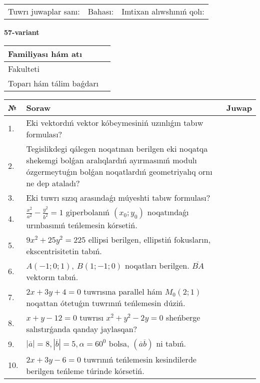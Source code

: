 \documentclass{article}
\begin{document}
\vspace{1cm}

\begin{tabular}{lll}
Tuwrı juwaplar sanı: \underline{\hspace{1.5cm}} & 
Bahası: \underline{\hspace{1.5cm}} & 
Imtixan alıwshınıń qolı: \underline{\hspace{2cm}} \\
\end{tabular}

\egroup

\newpage


\textbf{57-variant}\\

\bgroup
\def\arraystretch{1.6} %

\begin{tabular}{|m{5.7cm}|m{9.5cm}|}
\hline
Familiyası hám atı & \\
\hline
Fakulteti  & \\
\hline
Toparı hám tálim baǵdarı  & \\
\hline
\end{tabular}

\vspace{1cm}

\begin{tabular}{|m{0.7cm}|m{10cm}|m{4cm}|}
\hline
№ & Soraw & Juwap \\
\hline
1. & Eki vektordıń vektor kóbeymesiniń uzınlıǵın tabıw formulası? &  \\
\hline
2. & Tegislikdegi qálegen noqatınan berilgen eki noqatqa shekemgi bolǵan aralıqlardıń ayırmasınıń modulı ózgermeytuǵın bolǵan noqatlardıń geometriyalıq ornı ne dep ataladı? &  \\
\hline
3. & Eki tuwrı sızıq arasındaǵı múyeshti tabıw formulası? &  \\
\hline
4. & $\frac{x^2}{a^2}-\frac{y^2}{b^2}=1$ giperbolanıń $(x_0;y_0)$ noqatındaǵı urınbasınıń teńlemesin kórsetiń. &  \\
\hline
5. & $9x^{2}+25y^{2}=225$ ellipsi berilgen, ellipstiń fokusların, ekscentrisitetin tabıń. &  \\
\hline
6. & $A (-1;0;1),\ B (1;-1;0)$ noqatları berilgen. $\overline{BA}$ vektorın tabıń. &  \\
\hline
7. & $2x+3y+4=0$ tuwrısına parallel hám $M_{0} (2;1)$ noqattan ótetuǵın tuwrınıń teńlemesin dúziń. &  \\
\hline
8. & $x+y-12=0$ tuwrısı $x^{2}+y^{2}-2y=0$ sheńberge salıstırǵanda qanday jaylasqan? &  \\
\hline
9. & $\left| \overline{a} \right|=8, \left| \overline{b} \right|=5, \alpha=60^{0}$ bolsa, $( \overline{a}\overline{b} )$ ni tabıń. &  \\
\hline
10. & $2x+3y-6=0$ tuwrınıń teńlemesin kesindilerde berilgen teńleme túrinde kórsetiń. &  \\
\hline
\end{tabular}
\end{document}
